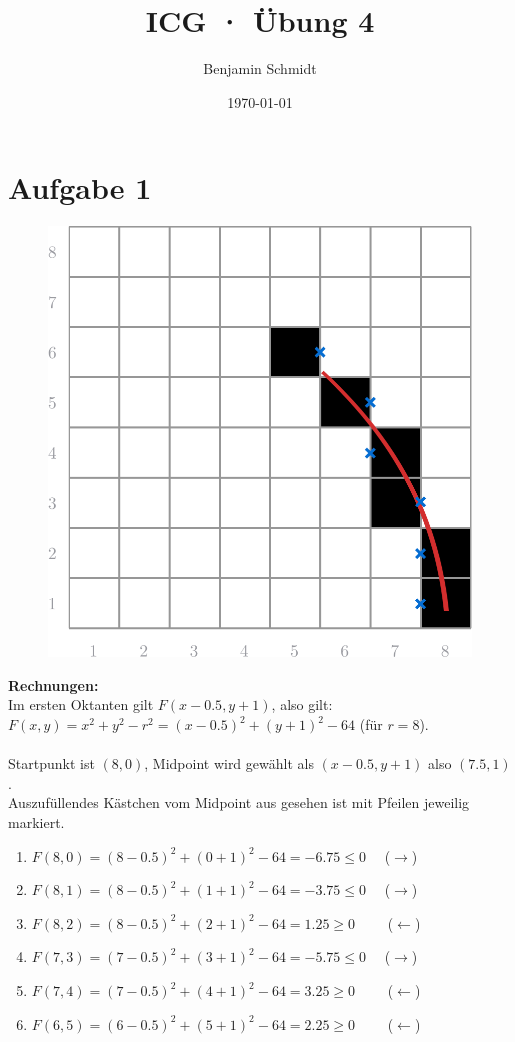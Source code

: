 \documentclass[a4paper,10pt]{article}
\title{ICG · Übung 4}
\author{Benjamin Schmidt}
\date{\today}
\begin{document}
	\maketitle

	\section*{Aufgabe 1}

	\begin{figure}[htb]
		\centering
		\includegraphics[scale=0.25]{Grid.png}
	\end{figure}

	\textbf{Rechnungen:} \\
	Im ersten Oktanten gilt $F(x - 0.5, y + 1)$, also gilt: \\
	$F(x,y) = x^2 + y^2 - r^2 = (x - 0.5)^2 + (y + 1)^2 - 64$ (für $r = 8$).\\~\\

	Startpunkt ist $(8, 0)$, Midpoint wird gewählt als $(x - 0.5, y + 1)$ also $(7.5, 1)$. \\
	Auszufüllendes Kästchen vom Midpoint aus gesehen ist mit Pfeilen jeweilig markiert.

	\begin{enumerate}[1.]
		\item $F(8,0) = (8 - 0.5)^2 + (0 + 1)^2 - 64 = -6.75 \leq 0$   ($\rightarrow$)
		\item $F(8,1) = (8 - 0.5)^2 + (1 + 1)^2 - 64 = -3.75 \leq 0$   ($\rightarrow$)
		\item $F(8,2) = (8 - 0.5)^2 + (2 + 1)^2 - 64 = 1.25 \geq 0$     ($\leftarrow$)
		\item $F(7,3) = (7 - 0.5)^2 + (3 + 1)^2 - 64 = -5.75 \leq 0$   ($\rightarrow$)
		\item $F(7,4) = (7 - 0.5)^2 + (4 + 1)^2 - 64 = 3.25 \geq 0$     ($\leftarrow$)
		\item $F(6,5) = (6 - 0.5)^2 + (5 + 1)^2 - 64 = 2.25 \geq 0$     ($\leftarrow$)
	\end{enumerate}
\end{document}
